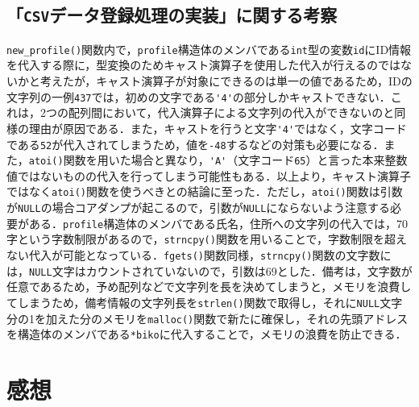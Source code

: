 \subsection{「\texttt{CSV}データ登録処理の実装」に関する考察}

\verb|new_profile()|関数内で，\verb|profile|構造体のメンバである\verb|int|型の変数\verb|id|にID情報を代入する際に，型変換のためキャスト演算子を使用した代入が行えるのではないかと考えたが，キャスト演算子が対象にできるのは単一の値であるため，IDの文字列の一例\verb|437|では，初めの文字である\verb|'4'|の部分しかキャストできない．これは，2つの配列間において，代入演算子による文字列の代入ができないのと同様の理由が原因である．また，キャストを行うと文字\verb|'4'|ではなく，文字コードである\verb|52|が代入されてしまうため，値を\verb|-48|するなどの対策も必要になる．また，\verb|atoi()|関数を用いた場合と異なり，\verb|'A'|（文字コード\verb|65|）と言った本来整数値ではないものの代入を行ってしまう可能性もある．以上より，キャスト演算子ではなく\verb|atoi()|関数を使うべきとの結論に至った．ただし，\verb|atoi()|関数は引数が\verb|NULL|の場合コアダンプが起こるので，引数が\verb|NULL|にならないよう注意する必要がある\cite{www:label7}．\verb|profile|構造体のメンバである氏名，住所への文字列の代入では，70字という字数制限があるので，\verb|strncpy()|関数を用いることで，字数制限を超えない代入が可能となっている．\verb|fgets()|関数同様，\verb|strncpy()|関数の文字数には，\verb|NULL|文字はカウントされていないので，引数は69とした．備考は，文字数が任意であるため，予め配列などで文字列を長を決めてしまうと，メモリを浪費してしまうため，備考情報の文字列長を\verb|strlen()|関数で取得し，それに\verb|NULL|文字分の1を加えた分のメモリを\verb|malloc()|関数で新たに確保し，それの先頭アドレスを構造体のメンバである\verb|*biko|に代入することで，メモリの浪費を防止できる．

\section{感想}\label{sec:review}

